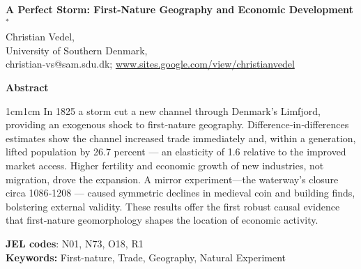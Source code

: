 \documentclass[12pt]{article}
\begin{document}
\begin{titlepage}

    \begin{center}
        \LARGE
        \textbf{A Perfect Storm: First-Nature Geography and Economic Development$^*$} \\
        
        \vspace{0.5cm}
        \large
        Christian Vedel, \\ University of Southern Denmark,\\
        \small
        \vspace{0.25cm}
        christian-vs@sam.sdu.dk; 
        \url{www.sites.google.com/view/christianvedel} 
        
        \vspace{0.75cm}
    
        \large
        \textbf{Abstract} \\     
    \end{center}

   
    \small
    \begin{changemargin}{1cm}{1cm}
    In 1825 a storm cut a new channel through Denmark’s Limfjord, providing an exogenous shock to first‑nature geography. Difference‑in‑differences estimates show the channel increased trade immediately and, within a generation, lifted population by 26.7 percent — an elasticity of 1.6 relative to the improved market access. Higher fertility and economic growth of new industries, not migration, drove the expansion. A mirror experiment—the waterway’s closure circa 1086‑1208 — caused symmetric declines in medieval coin and building finds, bolstering external validity. These results offer the first robust causal evidence that first‑nature geomorphology shapes the location of economic activity.
    
    \vspace{0.05cm} 
    \textbf{JEL codes}: N01, N73, O18, R1 \\
    \textbf{Keywords:} First-nature, Trade, Geography, Natural Experiment
    \end{changemargin}

    
    
    \vfill
    

\end{titlepage}
\end{document}
